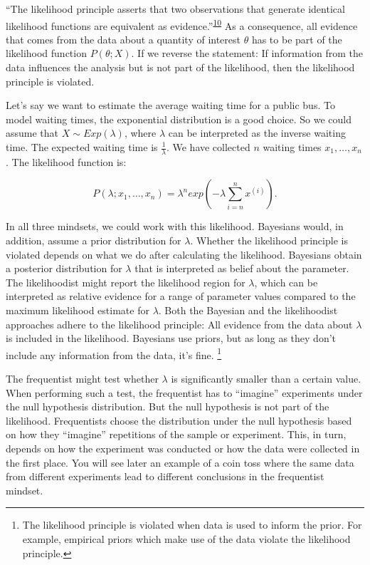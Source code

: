\documentclass[
  10pt,
]{scrbook}
\begin{document}
``The likelihood principle asserts that two observations that generate identical likelihood functions are equivalent as evidence.''\textsuperscript{\protect\hyperlink{ref-richard2017statistical}{10}}
As a consequence, all evidence that comes from the data about a quantity of interest \(\theta\) has to be part of the likelihood function \(P(\theta;X)\).
If we reverse the statement: If information from the data influences the analysis but is not part of the likelihood, then the likelihood principle is violated.

Let's say we want to estimate the average waiting time for a public bus.
To model waiting times, the exponential distribution is a good choice.
So we could assume that \(X \sim Exp(\lambda)\), where \(\lambda\) can be interpreted as the inverse waiting time.
The expected waiting time is \(\frac{1}{\lambda}\).
We have collected \(n\) waiting times \(x_1, \ldots, x_n\).
The likelihood function is:

\[P(\lambda; x_1, \ldots, x_n) = \lambda^n exp\left(-\lambda \sum_{i=n}^n x^{(i)}\right).\]

In all three mindsets, we could work with this likelihood.
Bayesians would, in addition, assume a prior distribution for \(\lambda\).
Whether the likelihood principle is violated depends on what we do after calculating the likelihood.
Bayesians obtain a posterior distribution for \(\lambda\) that is interpreted as belief about the parameter.
The likelihoodist might report the likelihood region for \(\lambda\), which can be interpreted as relative evidence for a range of parameter values compared to the maximum likelihood estimate for \(\lambda\).
Both the Bayesian and the likelihoodist approaches adhere to the likelihood principle:
All evidence from the data about \(\lambda\) is included in the likelihood.
Bayesians use priors, but as long as they don't include any information from the data, it's fine. \footnote{The likelihood principle is violated when data is used to inform the prior. For example, empirical priors which make use of the data violate the likelihood principle.}

The frequentist might test whether \(\lambda\) is significantly smaller than a certain value.
When performing such a test, the frequentist has to ``imagine'' experiments under the null hypothesis distribution.
But the null hypothesis is not part of the likelihood.
Frequentists choose the distribution under the null hypothesis based on how they ``imagine'' repetitions of the sample or experiment.
This, in turn, depends on how the experiment was conducted or how the data were collected in the first place.
You will see later an example of a coin toss where the same data from different experiments lead to different conclusions in the frequentist mindset.
\end{document}
